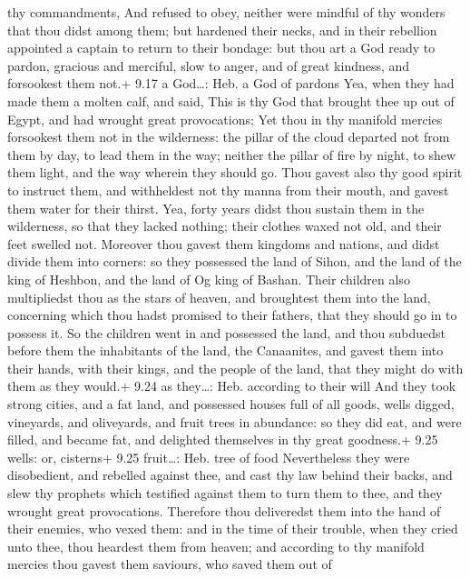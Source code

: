 thy commandments,  And refused to obey, neither were
mindful of thy wonders that thou didst among them; but hardened their
necks, and in their rebellion appointed a captain to return to their
bondage: but thou art a God ready to pardon, gracious and merciful, slow
to anger, and of great kindness, and forsookest them not.+ 9.17 a
God\ldots: Heb. a God of pardons  Yea, when they had made
them a molten calf, and said, This is thy God that brought thee up out
of Egypt, and had wrought great provocations;  Yet thou in
thy manifold mercies forsookest them not in the wilderness: the pillar
of the cloud departed not from them by day, to lead them in the way;
neither the pillar of fire by night, to shew them light, and the way
wherein they should go.  Thou gavest also thy good spirit
to instruct them, and withheldest not thy manna from their mouth, and
gavest them water for their thirst.  Yea, forty years didst
thou sustain them in the wilderness, so that they lacked nothing; their
clothes waxed not old, and their feet swelled not. 
Moreover thou gavest them kingdoms and nations, and didst divide them
into corners: so they possessed the land of Sihon, and the land of the
king of Heshbon, and the land of Og king of Bashan.  Their
children also multipliedst thou as the stars of heaven, and broughtest
them into the land, concerning which thou hadst promised to their
fathers, that they should go in to possess it.  So the
children went in and possessed the land, and thou subduedst before them
the inhabitants of the land, the Canaanites, and gavest them into their
hands, with their kings, and the people of the land, that they might do
with them as they would.+ 9.24 as they\ldots: Heb. according to their
will  And they took strong cities, and a fat land, and
possessed houses full of all goods, wells digged, vineyards, and
oliveyards, and fruit trees in abundance: so they did eat, and were
filled, and became fat, and delighted themselves in thy great goodness.+
9.25 wells: or, cisterns+ 9.25 fruit\ldots: Heb. tree of food
 Nevertheless they were disobedient, and rebelled against
thee, and cast thy law behind their backs, and slew thy prophets which
testified against them to turn them to thee, and they wrought great
provocations.  Therefore thou deliveredst them into the
hand of their enemies, who vexed them: and in the time of their trouble,
when they cried unto thee, thou heardest them from heaven; and according
to thy manifold mercies thou gavest them saviours, who saved them out of

